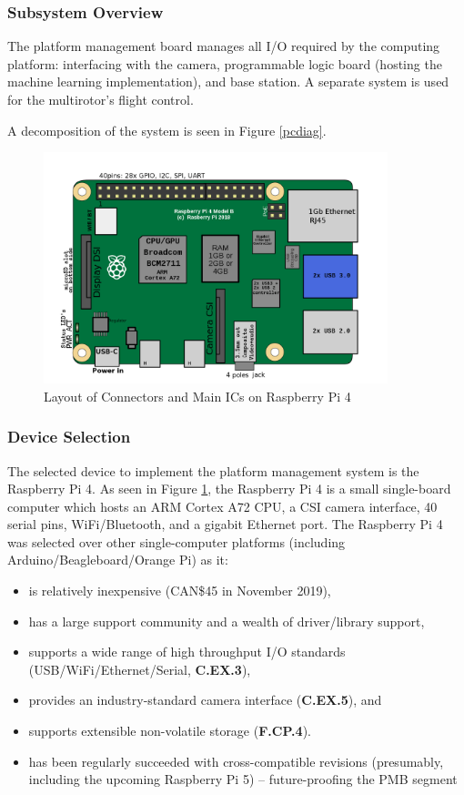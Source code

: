 \subsubsection{Subsystem Overview}
The platform management board manages all I/O required by the computing platform: interfacing with the camera, programmable logic board (hosting the machine learning implementation), and base station. A separate system is used for the multirotor's flight control.

A decomposition of the system is seen in Figure \ref{pcdiag}.

\begin{figure}[H]
\centering
\includegraphics[width=10cm]{img/RaspberryPi_Model_4B.png}
\caption[Layout of Connectors and Main ICs on Raspberry Pi 4]{Layout of Connectors and Main ICs on Raspberry Pi 4\cite{rpidiag}}
\label{rpi}
\end{figure}

\subsubsection{Device Selection}
The selected device to implement the platform management system is the Raspberry Pi 4. As seen in Figure \ref{rpi}, the Raspberry Pi 4 is a small single-board computer which hosts an ARM Cortex A72 CPU, a CSI camera interface, 40 serial pins, WiFi/Bluetooth, and a gigabit Ethernet port. The Raspberry Pi 4 was selected over other single-computer platforms (including Arduino/Beagleboard/Orange Pi) as it:
\begin{itemize}
\item is relatively inexpensive (CAN\$45 in November 2019),
\item has a large support community and a wealth of driver/library support,
\item supports a wide range of high throughput I/O standards (USB/WiFi/Ethernet/Serial, \textbf{C.EX.3}),
\item provides an industry-standard camera interface (\textbf{C.EX.5}), and
\item supports extensible non-volatile storage (\textbf{F.CP.4}).
\item has been regularly succeeded with cross-compatible revisions (presumably, including the upcoming Raspberry Pi 5) -- future-proofing the PMB segment
\end{itemize} 

